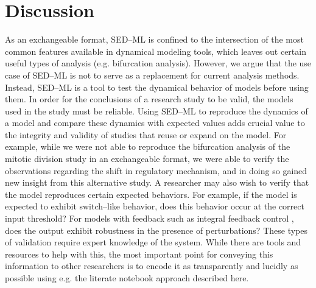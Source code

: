 \documentclass[10pt,letterpaper]{article}
\begin{document}
\section*{Discussion}

As an exchangeable format, SED--ML is confined to the intersection of the most common features available in dynamical modeling tools, which leaves out certain useful types of analysis (e.g. bifurcation analysis). However, we argue that the use case of SED--ML is not to serve as a replacement for current analysis methods. Instead, SED--ML is a tool to test the dynamical behavior of models before using them. In order for the conclusions of a research study to be valid, the models used in the study must be reliable. Using SED--ML to reproduce the dynamics of a model and compare these dynamics with expected values adds crucial value to the integrity and validity of studies that reuse or expand on the model. For example, while we were not able to reproduce the bifurcation analysis of the mitotic division study \cite{calzone2007dynamical} in an exchangeable format, we were able to verify the observations regarding the shift in regulatory mechanism, and in doing so gained new insight from this alternative study.
A researcher may also wish to verify that the model reproduces certain expected behaviors. For example, if the model is expected to exhibit switch--like behavior, does this behavior occur at the correct input threshold? For models with feedback such as integral feedback control \cite{briat2016antithetic}, does the output exhibit robustness in the presence of perturbations? These types of validation require expert knowledge of the system. While there are tools and resources to help with this, the most important point for conveying this information to other researchers is to encode it as transparently and lucidly as possible using e.g. the literate notebook approach described here.
\end{document}
